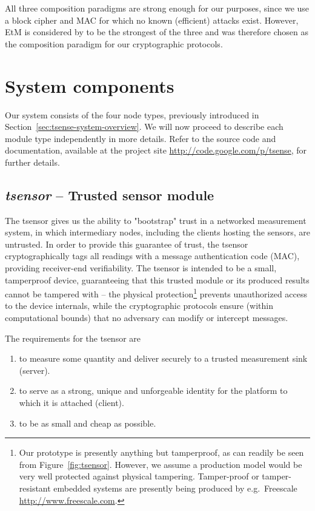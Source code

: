 All three composition paradigms are strong enough for our purposes, since we use a block cipher and MAC for which no known (efficient) attacks exist. However, EtM is considered by \citeauthor{bellare2007} to be the strongest of the three and was therefore chosen as the composition paradigm for our cryptographic protocols.

\section{System components}

Our system consists of the four node types, previously introduced in Section~\ref{sec:tsense-system-overview}. We will now proceed to describe each module type independently in more details. Refer to the source code and documentation, available at the project site \url{http://code.google.com/p/tsense}, for further details.

\subsection{\textit{tsensor} -- Trusted sensor module}
\label{tsensor}

The tsensor gives us the ability to "bootstrap" trust in a networked measurement system, in which intermediary nodes, including the clients hosting the sensors, are untrusted. In order to provide this guarantee of trust, the tsensor cryptographically tags all readings with a message authentication code (MAC), providing receiver-end verifiability. The tsensor is intended to be a small, tamperproof device, guaranteeing that this trusted module or its produced results cannot be tampered with -- the physical protection\footnote{Our prototype is presently anything but tamperproof, as can readily be seen from Figure~\ref{fig:tsensor}. However, we assume a production model would be very well protected against physical tampering. Tamper-proof or tamper-resistant embedded systems are presently being produced by e.g.\ Freescale \url{http://www.freescale.com}.} prevents unauthorized access to the device internals, while the cryptographic protocols ensure (within computational bounds) that no adversary can modify or intercept messages. 

The requirements for the tsensor are
\begin{enumerate}
\item to measure some quantity and deliver securely to a trusted measurement sink (server).
\item to serve as a strong, unique and unforgeable identity for the platform to which it is attached (client).
\item to be as small and cheap as possible.
\end{enumerate}

